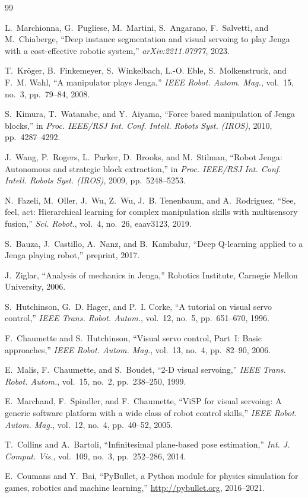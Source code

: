 \documentclass[conference]{IEEEtran}
\begin{document}
\begin{thebibliography}{99}

L.~Marchionna, G.~Pugliese, M.~Martini, S.~Angarano, F.~Salvetti, and M.~Chiaberge,
``Deep instance segmentation and visual servoing to play Jenga with a cost-effective
robotic system,'' \emph{arXiv:2211.07977}, 2023.

T.~Kr\"oger, B.~Finkemeyer, S.~Winkelbach, L.-O. Eble, S.~Molkenstruck, and F.~M. Wahl,
``A manipulator plays Jenga,'' \emph{IEEE Robot. Autom. Mag.}, vol.~15, no.~3,
pp.~79--84, 2008.

S.~Kimura, T.~Watanabe, and Y.~Aiyama, ``Force based manipulation of Jenga blocks,''
in \emph{Proc. IEEE/RSJ Int. Conf. Intell. Robots Syst. (IROS)}, 2010, pp.~4287--4292.

J.~Wang, P.~Rogers, L.~Parker, D.~Brooks, and M.~Stilman, ``Robot Jenga: Autonomous
and strategic block extraction,'' in \emph{Proc. IEEE/RSJ Int. Conf. Intell. Robots
Syst. (IROS)}, 2009, pp.~5248--5253.

N.~Fazeli, M.~Oller, J.~Wu, Z.~Wu, J.~B. Tenenbaum, and A.~Rodriguez, ``See, feel, act:
Hierarchical learning for complex manipulation skills with multisensory fusion,''
\emph{Sci. Robot.}, vol.~4, no.~26, eaav3123, 2019.

S.~Bauza, J.~Castillo, A.~Nanz, and B.~Kambalur, ``Deep Q-learning applied to a Jenga
playing robot,'' preprint, 2017.

J.~Ziglar, ``Analysis of mechanics in Jenga,'' Robotics Institute, Carnegie Mellon
University, 2006.

S.~Hutchinson, G.~D. Hager, and P.~I. Corke, ``A tutorial on visual servo control,''
\emph{IEEE Trans. Robot. Autom.}, vol.~12, no.~5, pp.~651--670, 1996.

F.~Chaumette and S.~Hutchinson, ``Visual servo control, Part~I: Basic approaches,''
\emph{IEEE Robot. Autom. Mag.}, vol.~13, no.~4, pp.~82--90, 2006.

E.~Malis, F.~Chaumette, and S.~Boudet, ``2\textonehalf-D visual servoing,''
\emph{IEEE Trans. Robot. Autom.}, vol.~15, no.~2, pp.~238--250, 1999.

E.~Marchand, F.~Spindler, and F.~Chaumette, ``ViSP for visual servoing: A generic
software platform with a wide class of robot control skills,'' \emph{IEEE Robot.
Autom. Mag.}, vol.~12, no.~4, pp.~40--52, 2005.

T.~Collins and A.~Bartoli, ``Infinitesimal plane-based pose estimation,''
\emph{Int. J. Comput. Vis.}, vol.~109, no.~3, pp.~252--286, 2014.

E.~Coumans and Y.~Bai, ``PyBullet, a Python module for physics simulation for games,
robotics and machine learning,'' \url{http://pybullet.org}, 2016--2021.

\end{thebibliography}
\end{document}
